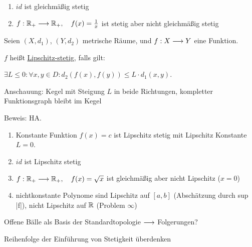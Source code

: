 \begin{example}
    \begin{enumerate}
        \item $id$ ist gleichmäßig stetig
        \item $f: \mathbb{R}_+ \longrightarrow \mathbb{R}_+, \quad f(x) = \frac{1}{x}$ ist stetig aber nicht gleichmäßig stetig
    \end{enumerate}
\end{example}

\begin{definition}
    Seien $(X, d_1)$, $(Y, d_2)$ metrische Räume, und $f: X \longrightarrow Y$ eine Funktion.
    
    $f$ heißt \underline{Lipschitz-stetig}, falls gilt:
    
    $\exists L \leq 0: \forall x, y \in D: d_2(f(x),f(y)) \leq L \cdot d_1(x,y)$.
\end{definition}

Anschauung: Kegel mit Steigung $L$ in beide Richtungen, kompletter Funktionsgraph bleibt im Kegel

\begin{lemma}
    Beweis: HA.
\end{lemma}

\begin{example}
    \begin{enumerate}
        \item Konstante Funktion $f(x) = c$ ist Lipschitz stetig mit Lipschitz Konstante $L = 0$.
        \item $id$ ist Lipschitz stetig
        \item $f: \mathbb{R}_+ \longrightarrow \mathbb{R}_+, \quad f(x) = \sqrt{x}$ ist gleichmäßig aber nicht Lipschitz ($x=0$)
        \item nichtkonstante Polynome sind Lipschitz auf $[a, b]$ (Abschätzung durch sup |f|), nicht Lipschitz auf $\mathbb{R}$ (Problem $\infty$)
    \end{enumerate}
\end{example}

Offene Bälle als Basis der Standardtopologie $\longrightarrow$ Folgerungen?

Reihenfolge der Einführung von Stetigkeit überdenken